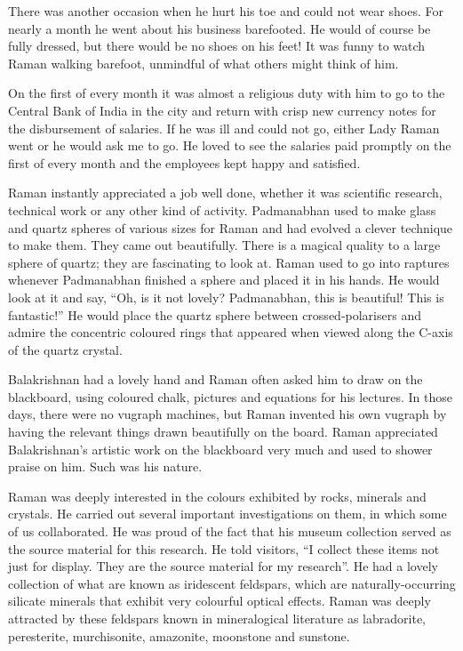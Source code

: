 \newpage

There was another occasion when he hurt his toe and could
not wear shoes. For nearly a month he went about his business
barefooted. He would of course be fully dressed, but there would
be no shoes on his feet! It was funny to watch Raman walking
barefoot, unmindful of what others might think of him.

On the first of every month it was almost a religious duty
with him to go to the Central Bank of India in the city and return
with crisp new currency notes for the disbursement of salaries.
If he was ill and could not go, either Lady Raman went or
he would ask me to go. He loved to see the salaries paid promptly
on the first of every month and the employees kept happy
and satisfied.

Raman instantly appreciated a job well done, whether it was
scientific research, technical work or any other kind of activity.
Padmanabhan used to make glass and quartz spheres of various
sizes for Raman and had evolved a clever technique to make them.
They came out beautifully. There is a magical quality to a large
sphere of quartz; they are fascinating to look at. Raman used
to go into raptures whenever Padmanabhan finished a sphere and
placed it in his hands. He would look at it and say, ``Oh, is it
not lovely? Padmanabhan, this is beautiful! This is fantastic!''
He would place the quartz sphere between crossed-polarisers and
admire the concentric coloured rings that appeared when viewed
along the C-axis of the quartz crystal.

Balakrishnan had a lovely hand and Raman often asked him
to draw on the blackboard, using coloured chalk, pictures and
equations for his lectures. In those days, there were no vugraph
machines, but Raman invented his own vugraph by having the
relevant things drawn beautifully on the board. Raman
appreciated Balakrishnan's artistic work on the blackboard very
much and used to shower praise on him. Such was his nature.

\medskip
{}
\smallskip


\noindent
Raman was deeply interested in the colours exhibited by
rocks, minerals and crystals. He carried out several important
investigations on them, in which some of us collaborated. He was
proud of the fact that his museum collection served as the source
material for this research. He told visitors, ``I collect these items
not just for display. They are the source material for my
research''. He had a lovely collection of what are known as
iridescent feldspars, which are naturally-occurring silicate minerals
that exhibit very colourful optical effects. Raman was deeply
attracted by these feldspars known in mineralogical literature as
labradorite, peresterite, murchisonite, amazonite, moonstone
and sunstone.

